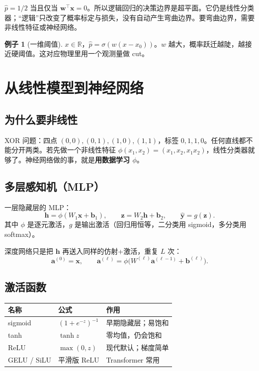 \documentclass[11pt,a4paper]{article}
\theoremstyle{definition}
\newtheorem{example}{例子}[section]
\theoremstyle{plain}
\theoremstyle{remark}
\newcommand{\R}{\mathbb{R}}
\newcommand{\sigm}{\sigma}
\begin{document}
$\hat p=1/2$ 当且仅当 $\mathbf{w}^\top\mathbf{x}=0$。所以逻辑回归的决策边界是超平面。它仍是线性分类器；``逻辑''只改变了概率标定与损失，没有自动产生弯曲边界。要弯曲边界，需要非线性特征或神经网络。

\begin{example}[一维阈值]
$x\in\R$，$\hat p=\sigm(w(x-x_0))$。$w$ 越大，概率跃迁越陡，越接近硬阈值。这对应物理里用一个观测量做 cut。
\end{example}

\section{从线性模型到神经网络}
\label{sec:nn}

\subsection{为什么要非线性}

XOR 问题：四点 $(0,0),(0,1),(1,0),(1,1)$，标签 $0,1,1,0$。任何直线都不能分开两类。若先做一个非线性特征 $\phi(x_1,x_2)=(x_1,x_2,x_1x_2)$，线性分类器就够了。神经网络做的事，就是\textbf{用数据学习 $\phi$}。

\subsection{多层感知机（MLP）}

一层隐藏层的 MLP：
\begin{equation}
\label{eq:mlp}
  \mathbf{h}=\phi(W_1\mathbf{x}+\mathbf{b}_1),\qquad
  \mathbf{z}=W_2\mathbf{h}+\mathbf{b}_2,\qquad
  \hat{\mathbf{y}}=g(\mathbf{z}).
\end{equation}
其中 $\phi$ 是逐元激活，$g$ 是输出激活（回归用恒等，二分类用 sigmoid，多分类用 softmax）。

深度网络只是把 $\mathbf{h}$ 再送入同样的仿射+激活，重复 $L$ 次：
\begin{equation}
  \mathbf{a}^{(0)}=\mathbf{x},\qquad
  \mathbf{a}^{(\ell)}=\phi\bigl(W^{(\ell)}\mathbf{a}^{(\ell-1)}+\mathbf{b}^{(\ell)}\bigr).
\end{equation}

\subsection{激活函数}

\begin{center}
\begin{tabular}{lll}
\toprule
名称 & 公式 & 作用 \\
\midrule
sigmoid & $(1+e^{-z})^{-1}$ & 早期隐藏层；易饱和 \\
tanh & $\tanh z$ & 零均值，仍会饱和 \\
ReLU & $\max(0,z)$ & 现代默认；梯度简单 \\
GELU / SiLU & 平滑版 ReLU & Transformer 常用 \\
\bottomrule
\end{tabular}
\end{center}
\end{document}
